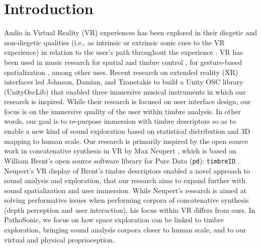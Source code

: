 \documentclass{nime-alternate}
\begin{document}


\printccsdesc

\section{Introduction}

Audio in Virtual Reality (VR) experiences has been explored in their diegetic and non-diegetic qualities (i.e., as intrinsic or extrinsic sonic cues to the VR experience) in relation to the user's path throughout the experience \cite{anil_camci_2019_3249315}. VR has been used in music research for spatial and timbre control \cite{rgraham2017}, for gesture-based spatialization \cite{giovanni_santini_2019_3249329}, among other uses. Recent research on extended reality (XR) interfaces led Johnson, Damian, and Tzanetakis \cite{david_johnson_2019_3249319} to build a Unity OSC library (UnityOscLib) that enabled three immersive musical instruments in which our research is inspired. While their research is focused on user interface design, our focus is on the immersive quality of the user within timbre analysis. In other words, our goal is to re-purpose immersion with timbre descriptors so as to enable a new kind of sound exploration based on statistical distribution and 3D mapping to human scale. Our research is primarily inspired by the open source work in concatenative synthesis in VR by Max Neupert \cite{neupert2017}, which is based on William Brent's open source software library for Pure Data (\texttt{pd}): \texttt{timbreID} \cite{icmc/bbp2372.2010.044}. Neupert's VR display of Brent’s timbre descriptors enabled a novel approach to sound analysis and exploration, that our research aims to expand further with sound spatialization and user immersion. While Neupert's research is aimed at solving performative issues when performing corpora of concatenative synthesis (depth perception and user interaction), his focus within VR differs from ours. In PathoSonic, we focus on how space exploration can be linked to timbre exploration, bringing sound analysis corpora closer to human scale, and to our virtual and physical proprioception. 
\end{document}

